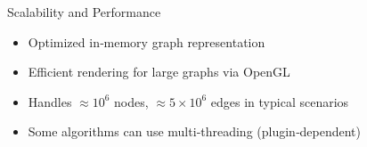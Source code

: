 \begin{frame}{Scalability and Performance}
	\begin{itemize}
		\item Optimized in‑memory graph representation
		\item Efficient rendering for large graphs via OpenGL
		\item Handles $\approx 10^6$ nodes, $\approx 5\times10^6$ edges in typical scenarios
		\item Some algorithms can use multi‑threading (plugin‑dependent)
	\end{itemize}
\end{frame}